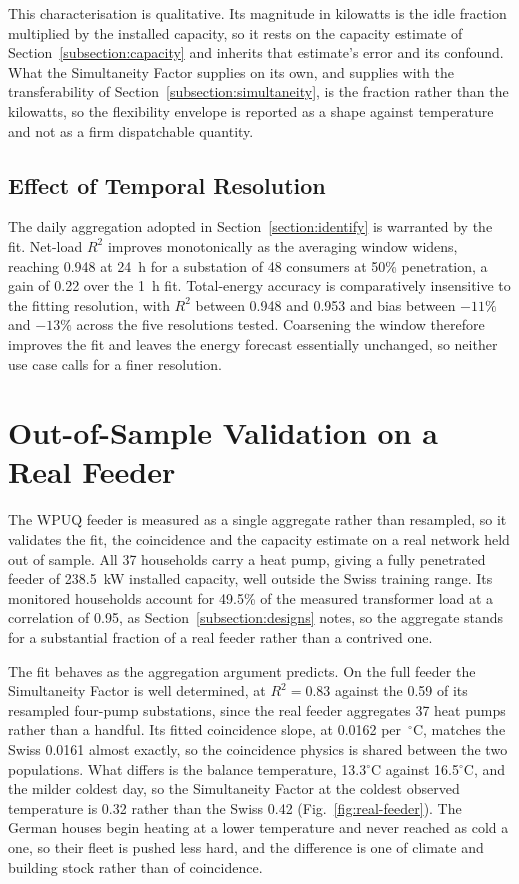 \documentclass[9pt,journal,a4]{IEEEtran}
\begin{document}
This characterisation is qualitative. Its magnitude in kilowatts is the idle fraction multiplied by the installed capacity, so it rests on the capacity estimate of Section~\ref{subsection:capacity} and inherits that estimate's error and its confound. What the Simultaneity Factor supplies on its own, and supplies with the transferability of Section~\ref{subsection:simultaneity}, is the fraction rather than the kilowatts, so the flexibility envelope is reported as a shape against temperature and not as a firm dispatchable quantity.

\subsection{Effect of Temporal Resolution}
\label{subsection:resolution}

The daily aggregation adopted in Section~\ref{section:identify} is warranted by the fit. Net-load $R^2$ improves monotonically as the averaging window widens, reaching 0.948 at 24~h for a substation of 48 consumers at 50\% penetration, a gain of 0.22 over the 1~h fit. Total-energy accuracy is comparatively insensitive to the fitting resolution, with $R^2$ between 0.948 and 0.953 and bias between $-11\%$ and $-13\%$ across the five resolutions tested. Coarsening the window therefore improves the fit and leaves the energy forecast essentially unchanged, so neither use case calls for a finer resolution.


\section{Out-of-Sample Validation on a Real Feeder}
\label{section:validation}

The WPUQ feeder is measured as a single aggregate rather than resampled, so it validates the fit, the coincidence and the capacity estimate on a real network held out of sample. All 37 households carry a heat pump, giving a fully penetrated feeder of 238.5~kW installed capacity, well outside the Swiss training range. Its monitored households account for 49.5\% of the measured transformer load at a correlation of 0.95, as Section~\ref{subsection:designs} notes, so the aggregate stands for a substantial fraction of a real feeder rather than a contrived one.

The fit behaves as the aggregation argument predicts. On the full feeder the Simultaneity Factor is well determined, at $R^2 = 0.83$ against the 0.59 of its resampled four-pump substations, since the real feeder aggregates 37 heat pumps rather than a handful. Its fitted coincidence slope, at 0.0162 per~$^\circ$C, matches the Swiss 0.0161 almost exactly, so the coincidence physics is shared between the two populations. What differs is the balance temperature, 13.3$^\circ$C against 16.5$^\circ$C, and the milder coldest day, so the Simultaneity Factor at the coldest observed temperature is 0.32 rather than the Swiss 0.42 (Fig.~\ref{fig:real-feeder}). The German houses begin heating at a lower temperature and never reached as cold a one, so their fleet is pushed less hard, and the difference is one of climate and building stock rather than of coincidence.
\end{document}

